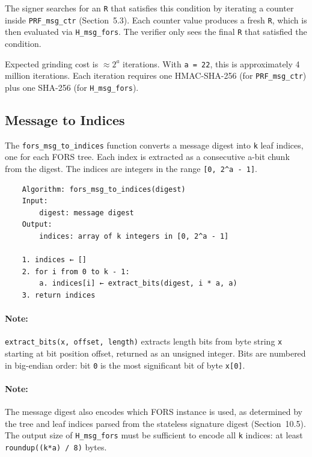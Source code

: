 The signer searches for an \texttt{R} that satisfies this condition by iterating a counter inside \texttt{PRF\_msg\_ctr} (Section~5.3). Each counter value produces a fresh \texttt{R}, which is then evaluated via \texttt{H\_msg\_fors}. The verifier only sees the final \texttt{R} that satisfied the condition.

Expected grinding cost is $\approx 2^a$ iterations. With \texttt{a = 22}, this is approximately 4 million iterations. Each iteration requires one HMAC-SHA-256 (for \texttt{PRF\_msg\_ctr}) plus one SHA-256 (for \texttt{H\_msg\_fors}).

\subsection{Message to Indices}
The \texttt{fors\_msg\_to\_indices} function converts a message digest into \texttt{k} leaf indices, one for each FORS tree. Each index is extracted as a consecutive a-bit chunk from the digest. The indices are integers in the range \texttt{[0, 2\string^a - 1]}.
\begin{verbatim}
    Algorithm: fors_msg_to_indices(digest)
    Input:
        digest: message digest
    Output:
        indices: array of k integers in [0, 2^a - 1]

    1. indices ← []
    2. for i from 0 to k - 1:
        a. indices[i] ← extract_bits(digest, i * a, a)
    3. return indices
\end{verbatim}

\paragraph{Note:} \texttt{extract\_bits(x, offset, length)} extracts length bits from byte string \texttt{x} starting at bit position offset, returned as an unsigned integer. Bits are numbered in big-endian order: bit \texttt{0} is the most significant bit of byte \texttt{x[0]}.
\paragraph{Note:} The message digest also encodes which FORS instance is used, as determined by the tree and leaf indices parsed from the stateless signature digest (Section~10.5). The output size of \texttt{H\_msg\_fors} must be sufficient to encode all \texttt{k} indices: at least \texttt{roundup((k*a) / 8)} bytes.

